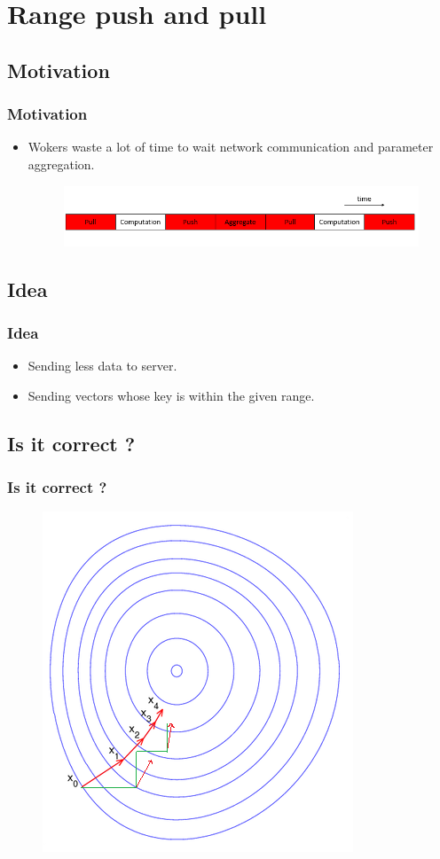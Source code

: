 \section{Range push and pull}

\subsection{Motivation}
\begin{frame}
    \frametitle{Motivation}
	\begin{itemize}
		\item Wokers waste a lot of time to wait network communication and parameter aggregation.
   		\begin{figure}
			\includegraphics[scale=0.4]{figure/time.png}
		\end{figure}
	\end{itemize}
\end{frame}

\subsection{Idea}
\begin{frame}
    \frametitle{Idea}
	\begin{itemize}
		\item Sending less data to server. 
		\item Sending vectors whose key is within the given range.   
	\end{itemize}
\end{frame}

\subsection{Is it correct ?}
\begin{frame}
    \frametitle{Is it correct ?}
    \begin{figure}
		\includegraphics[scale=0.4]{figure/spGD.png}
	\end{figure}
\end{frame}


